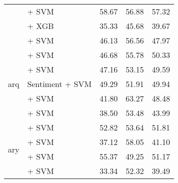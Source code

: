 \begin{longtable}{llccc}
                                       & \citep{rasyosef2025llamaamharic} + SVM                             & 58.67                                & 56.88              & 57.32             \\
                                       & \citep{rasyosef2025robertaamharic} + XGB                           & 35.33                                & 45.68              & 39.67             \\
                                       & \citep{rasyosef2025robertaamharic} + SVM                           & 46.13                                & 56.56              & 47.97             \\
    \midrule
    \multirow{5}{*}{arq}               & \citep{arabert} + SVM                                              & 46.68                                & 55.78              & 50.33             \\
                                       & \citep{dziribert} + SVM                                            & 47.16                                & 53.15              & 49.59             \\
                                       & \citep{dziribert} Sentiment + SVM                                  & 49.29                                & 51.91              & 49.94             \\
                                       & \citep{wang2024multilingual} + SVM                                 & 41.80                                & 63.27              & 48.48             \\
                                       & \citep{nacar2025GATE} + SVM                                        & 38.50                                & 53.48              & 43.99             \\
    \midrule
    \multirow{4}{*}{ary}               & \citep{safaya-etal-2020-kuisail} + SVM                             & 52.82                                & 53.64              & 51.81             \\
                                       & \citep{gaanoun2023darijabert} + SVM                                & 37.12                                & 58.05              & 41.10             \\
                                       & \citep{wang2024multilingual} + SVM                                 & 55.37                                & 49.25              & 51.17             \\
                                       & \citep{nacar2025GATE} + SVM                                        & 33.34                                & 52.32              & 39.49             \\

\end{longtable}
